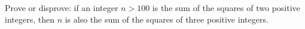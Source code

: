 Prove or disprove: if an integer $n>100$ is the sum of the squares of two positive integers, then $n$ is also the sum of the squares of three positive integers.
